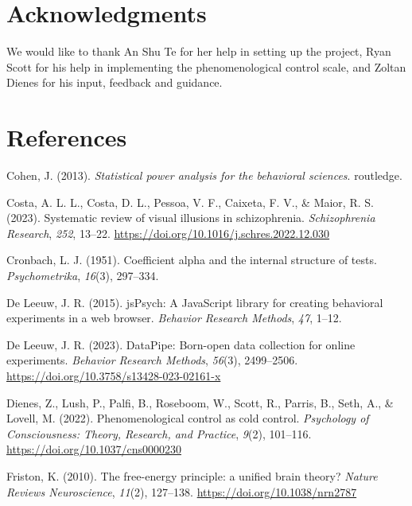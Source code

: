\documentclass[
  man,
  floatsintext,
  longtable,
  nolmodern,
  notxfonts,
  notimes,
  colorlinks=true,linkcolor=blue,citecolor=blue,urlcolor=blue]{apa7}
\newlength{\cslhangindent}
\newenvironment{CSLReferences}[2] %
 {\begin{list}{}{%
  \setlength{\itemindent}{0pt}
  \setlength{\leftmargin}{0pt}
  \setlength{\parsep}{0pt}
  \ifodd #1
   \setlength{\leftmargin}{\cslhangindent}
   \setlength{\itemindent}{-1\cslhangindent}
  \fi
  \setlength{\itemsep}{#2\baselineskip}}}
 {\end{list}}
\begin{document}
\section{Acknowledgments}\label{acknowledgments}

We would like to thank An Shu Te for her help in setting up the project,
Ryan Scott for his help in implementing the phenomenological control
scale, and Zoltan Dienes for his input, feedback and guidance.

\pagebreak

\section{References}\label{references}

\label{refs}
\begin{CSLReferences}{1}{0}
Cohen, J. (2013). \emph{Statistical power analysis for the behavioral
sciences}. routledge.

Costa, A. L. L., Costa, D. L., Pessoa, V. F., Caixeta, F. V., \& Maior,
R. S. (2023). Systematic review of visual illusions in schizophrenia.
\emph{Schizophrenia Research}, \emph{252}, 13--22.
\url{https://doi.org/10.1016/j.schres.2022.12.030}

Cronbach, L. J. (1951). Coefficient alpha and the internal structure of
tests. \emph{Psychometrika}, \emph{16}(3), 297--334.

De Leeuw, J. R. (2015). jsPsych: A JavaScript library for creating
behavioral experiments in a web browser. \emph{Behavior Research
Methods}, \emph{47}, 1--12.

De Leeuw, J. R. (2023). DataPipe: Born-open data collection for online
experiments. \emph{Behavior Research Methods}, \emph{56}(3), 2499--2506.
\url{https://doi.org/10.3758/s13428-023-02161-x}

Dienes, Z., Lush, P., Palfi, B., Roseboom, W., Scott, R., Parris, B.,
Seth, A., \& Lovell, M. (2022). Phenomenological control as cold
control. \emph{Psychology of Consciousness: Theory, Research, and
Practice}, \emph{9}(2), 101--116.
\url{https://doi.org/10.1037/cns0000230}

Friston, K. (2010). The free-energy principle: a unified brain theory?
\emph{Nature Reviews Neuroscience}, \emph{11}(2), 127--138.
\url{https://doi.org/10.1038/nrn2787}


\end{CSLReferences}
\end{document}

